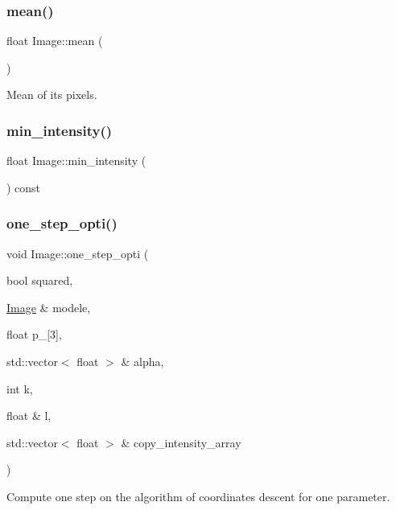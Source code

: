 \subsubsection{\texorpdfstring{mean()}{mean()}}
{\footnotesize\ttfamily float Image\+::mean (\begin{DoxyParamCaption}{ }\end{DoxyParamCaption})}



Mean of its pixels. 

\mbox{\label{class_image_a95722e3f24951df7cc6a88e152da9e2d}} 
\subsubsection{\texorpdfstring{min\+\_\+intensity()}{min\_intensity()}}
{\footnotesize\ttfamily float Image\+::min\+\_\+intensity (\begin{DoxyParamCaption}{ }\end{DoxyParamCaption}) const}

\mbox{\label{class_image_ac12c55408bf0f10d274fc109484b65d2}} 
\subsubsection{\texorpdfstring{one\+\_\+step\+\_\+opti()}{one\_step\_opti()}}
{\footnotesize\ttfamily void Image\+::one\+\_\+step\+\_\+opti (\begin{DoxyParamCaption}\item[{bool}]{squared,  }\item[{\hyperlink{class_image}{Image} \&}]{modele,  }\item[{float}]{p\+\_\mbox{[}3\mbox{]},  }\item[{std\+::vector$<$ float $>$ \&}]{alpha,  }\item[{int}]{k,  }\item[{float \&}]{l,  }\item[{std\+::vector$<$ float $>$ \&}]{copy\+\_\+intensity\+\_\+array }\end{DoxyParamCaption})}



Compute one step on the algorithm of coordinates descent for one parameter. 


